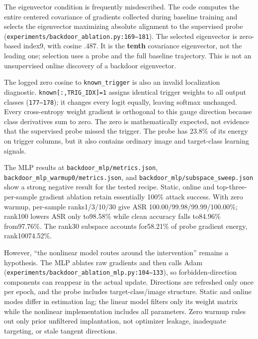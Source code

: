 \documentclass[
  british,
  10pt,
  a4paper,
]{article}
\begin{document}
The eigenvector condition is frequently
misdescribed\allowbreak{}.\allowbreak{} The code computes the entire
centered covariance of gradients collected during baseline training and
selects the eigenvector maximizing absolute alignment to the supervised
probe
(\texttt{experiments/\allowbreak{}backdoor\_\allowbreak{}ablation.\allowbreak{}py:\allowbreak{}169–181}).
The selected eigenvector is zero-based index9, with cosine .487. It is
the \textbf{tenth} covariance eigenvector,\allowbreak{} not the leading
one; selection uses a probe and the full baseline
trajectory.\allowbreak{} This is not an unsupervised online discovery of
a backdoor eigenvector.\allowbreak{}

The logged zero cosine to \texttt{known\_\allowbreak{}trigger} is also
an invalid localization diagnostic.\allowbreak{}
\texttt{known[:\allowbreak{},\allowbreak{}TRIG\_\allowbreak{}IDX]=\allowbreak{}1}
assigns identical trigger weights to all output classes
(\texttt{177–178}); it changes every logit equally, leaving softmax
unchanged. Every cross-\allowbreak{}entropy weight gradient is
orthogonal to this gauge direction because class derivatives sum to
zero. The zero is mathematically expected, not evidence that the
supervised probe missed the trigger. The probe has 23.8\% of its energy
on trigger columns, but it also contains ordinary image and
target-\allowbreak{}class learning signals.

The MLP results at
\texttt{backdoor\_\allowbreak{}mlp/\allowbreak{}metrics.\allowbreak{}json},
\texttt{backdoor\_\allowbreak{}mlp\_\allowbreak{}warmup0/\allowbreak{}metrics.\allowbreak{}json},
and
\texttt{backdoor\_\allowbreak{}mlp/\allowbreak{}subspace\_\allowbreak{}sweep.\allowbreak{}json}
show a strong negative result for the tested recipe. Static, online and
top-\allowbreak{}three-\allowbreak{}per-\allowbreak{}sample gradient
ablation retain essentially 100\% attack success. With zero warmup,
per-sample ranks1/\allowbreak{}3/\allowbreak{}10/\allowbreak{}30 give
ASR
100.\allowbreak{}00/\allowbreak{}99.\allowbreak{}98/\allowbreak{}99.\allowbreak{}99/\allowbreak{}100.\allowbreak{}00\%;
rank100 lowers ASR only to98.58\% while clean accuracy falls to84.96\%
from97.\allowbreak{}76\%.\allowbreak{} The rank30 subspace accounts
for58.21\% of probe gradient energy,
rank10074.\allowbreak{}52\%.\allowbreak{}

However, ``the nonlinear model routes around the intervention'' remains
a hypothesis.\allowbreak{} The MLP ablates raw gradients and then calls
Adam
(\texttt{experiments/\allowbreak{}backdoor\_\allowbreak{}ablation\_\allowbreak{}mlp.\allowbreak{}py:\allowbreak{}104–133}),
so forbidden-\allowbreak{}direction components can reappear in the
actual update. Directions are refreshed only once per epoch, and the
probe includes target-\allowbreak{}class/\allowbreak{}image structure.
Static and online modes differ in estimation lag; the linear model
filters only its weight matrix while the nonlinear implementation
includes all parameters.\allowbreak{} Zero warmup rules out only prior
unfiltered implantation\allowbreak{},\allowbreak{} not optimizer
leakage, inadequate targeting, or stale tangent directions.\allowbreak{}
\end{document}
